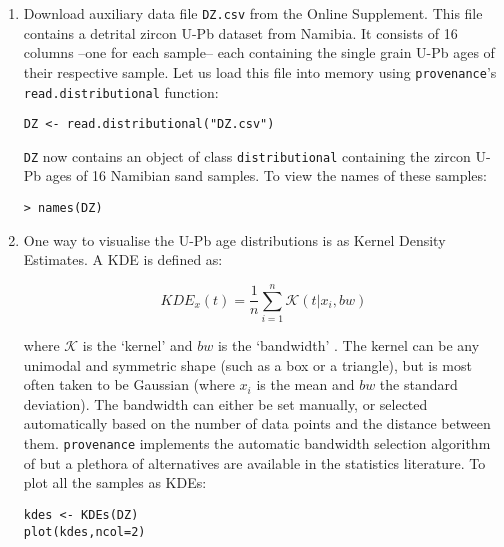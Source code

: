 \documentclass[11pt]{article}
\begin{document}
\begin{enumerate}

\item Download auxiliary data file \texttt{DZ.csv} from the Online
  Supplement. This file contains a detrital zircon U-Pb dataset from
  Namibia. It consists of 16 columns --one for each sample-- each
  containing the single grain U-Pb ages of their respective
  sample. Let us load this file into memory using
  \texttt{provenance}'s \texttt{read.distributional} function:

\begin{verbatim}
DZ <- read.distributional("DZ.csv")
\end{verbatim}

  \texttt{DZ} now contains an object of class \texttt{distributional}
  containing the zircon U-Pb ages of 16 Namibian sand samples.  To view
  the names of these samples:

\begin{verbatim}
> names(DZ)
\end{verbatim}

\item One way to visualise the U-Pb age distributions is as Kernel Density
  Estimates. A KDE is defined as:

  \begin{equation}
    KDE_x(t) = \frac{1}{n} \sum\limits_{i=1}^{n} \mathcal{K}(t|x_i,bw)
    \label{eq:KDE}
  \end{equation}

  where $\mathcal{K}$ is the `kernel' and $bw$ is the `bandwidth'
  \citep{silverman1986, vermeesch2012b}. The kernel can be any
  unimodal and symmetric shape (such as a box or a triangle), but is
  most often taken to be Gaussian (where $x_i$ is the mean and $bw$
  the standard deviation). The bandwidth can either be set manually,
  or selected automatically based on the number of data points and the
  distance between them. \texttt{provenance} implements the automatic
  bandwidth selection algorithm of \citet{botev2010} but a plethora of
  alternatives are available in the statistics literature. To plot all
  the samples as KDEs:

\begin{verbatim}
kdes <- KDEs(DZ)
plot(kdes,ncol=2)
\end{verbatim}


\end{enumerate}
\end{document}

